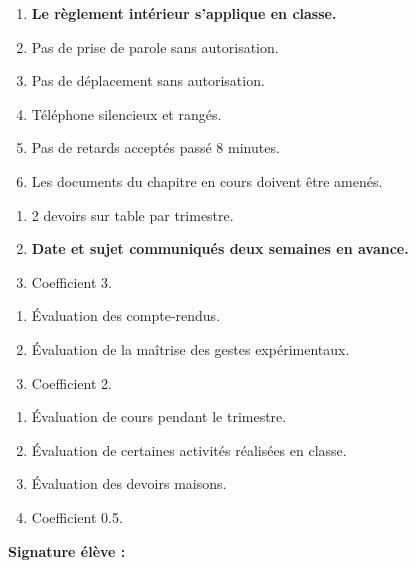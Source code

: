 \newpage
\pasDePagination


\large

\begin{enumerate}
  \item \textbf{Le règlement intérieur s'applique en classe.}
  \item Pas de prise de parole sans autorisation.
  \item Pas de déplacement sans autorisation.
  \item Téléphone silencieux et rangés.
  \item Pas de retards acceptés passé 8 minutes.
  \item Les documents du chapitre en cours doivent  être amenés.
\end{enumerate}

\begin{center}
\end{center}

\vspace*{-0.8cm}
\ligne




\begin{enumerate}
  \item 2 devoirs sur table par trimestre.
  \item \textbf{Date et sujet communiqués deux semaines en avance.}
  \item Coefficient 3.
\end{enumerate}



\begin{enumerate}
  \item Évaluation des compte-rendus.
  \item Évaluation de la maîtrise des gestes expérimentaux.
  \item Coefficient 2.
\end{enumerate}



\begin{enumerate}
  \item \'Evaluation de cours pendant le trimestre.
  \item \'Evaluation de certaines activités réalisées en classe.
  \item \'Evaluation des devoirs maisons.
  \item Coefficient 0.5.
\end{enumerate}


\bigskip
\normalsize
\textbf{Signature élève :}